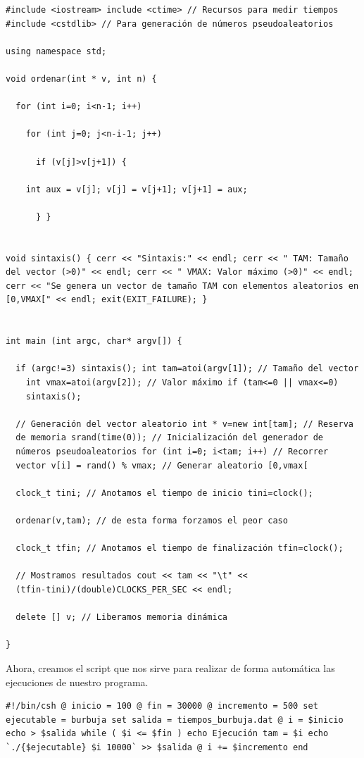 \documentclass[11pt]{article}
\begin{document}
\begin{verbatim}
#include <iostream> include <ctime> // Recursos para medir tiempos
#include <cstdlib> // Para generación de números pseudoaleatorios

using namespace std;

void ordenar(int * v, int n) {

  for (int i=0; i<n-1; i++)

    for (int j=0; j<n-i-1; j++)

      if (v[j]>v[j+1]) {

	int aux = v[j]; v[j] = v[j+1]; v[j+1] = aux;

      } }


void sintaxis() { cerr << "Sintaxis:" << endl; cerr << " TAM: Tamaño
del vector (>0)" << endl; cerr << " VMAX: Valor máximo (>0)" << endl;
cerr << "Se genera un vector de tamaño TAM con elementos aleatorios en
[0,VMAX[" << endl; exit(EXIT_FAILURE); }


int main (int argc, char* argv[]) {

  if (argc!=3) sintaxis(); int tam=atoi(argv[1]); // Tamaño del vector
    int vmax=atoi(argv[2]); // Valor máximo if (tam<=0 || vmax<=0)
    sintaxis();

  // Generación del vector aleatorio int * v=new int[tam]; // Reserva
  de memoria srand(time(0)); // Inicialización del generador de
  números pseudoaleatorios for (int i=0; i<tam; i++) // Recorrer
  vector v[i] = rand() % vmax; // Generar aleatorio [0,vmax[

  clock_t tini; // Anotamos el tiempo de inicio tini=clock();

  ordenar(v,tam); // de esta forma forzamos el peor caso

  clock_t tfin; // Anotamos el tiempo de finalización tfin=clock();

  // Mostramos resultados cout << tam << "\t" <<
  (tfin-tini)/(double)CLOCKS_PER_SEC << endl;

  delete [] v; // Liberamos memoria dinámica

}
\end{verbatim}

Ahora, creamos el script que nos sirve para realizar de forma
automática las ejecuciones de nuestro programa.

\begin{verbatim}
#!/bin/csh @ inicio = 100 @ fin = 30000 @ incremento = 500 set
ejecutable = burbuja set salida = tiempos_burbuja.dat @ i = $inicio
echo > $salida while ( $i <= $fin ) echo Ejecución tam = $i echo
`./{$ejecutable} $i 10000` >> $salida @ i += $incremento end
\end{verbatim}
\end{document}
